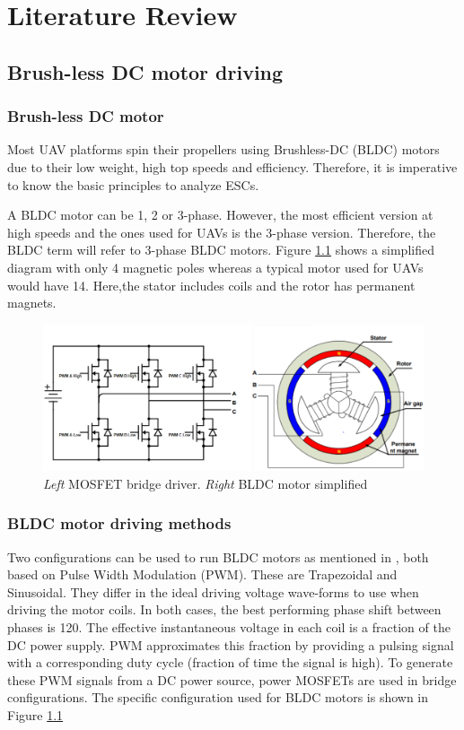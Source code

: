 \chapter{Literature Review}
\section{Brush-less DC motor driving}
\subsection{Brush-less DC motor}
Most UAV platforms spin their propellers using Brushless-DC (BLDC) motors due to their low weight, high top speeds and efficiency. Therefore, it is  imperative to know the basic principles to analyze ESCs. 

A BLDC motor can be 1, 2 or 3-phase. However, the most efficient version at high speeds and the ones used for UAVs is the 3-phase version. Therefore, the BLDC term will refer to 3-phase BLDC motors. Figure \ref{fig:bldcm} shows a simplified diagram with only 4 magnetic poles whereas a typical motor used for UAVs would have 14. Here,the stator includes coils and the rotor has permanent magnets.

\begin{figure}
    \centering
    \includegraphics[width=\textwidth]{images/bldcm_diagram.png}
    \caption{\textit{Left} MOSFET bridge driver. \textit{Right} BLDC motor simplified \cite{Zhao_BLDCFundamentals}}
    \label{fig:bldcm}
\end{figure}

\subsection{BLDC motor driving methods}
Two configurations can be used to run BLDC motors as mentioned in \cite{Mogensen_ESC_Motor_Control2016}, both based on Pulse Width Modulation (PWM). These are Trapezoidal and Sinusoidal. They differ in the ideal driving voltage wave-forms to use when driving the motor coils. In both cases, the best performing phase shift between phases is 120\textdegree.  The effective instantaneous voltage in each coil is a fraction of the DC power supply. PWM approximates this fraction by providing a pulsing signal with a corresponding duty cycle (fraction of time the signal is high). 
To generate these PWM signals from a DC power source, power MOSFETs are used in bridge configurations. The specific configuration used for BLDC motors is shown in Figure \ref{fig:bldcm}
\newline

